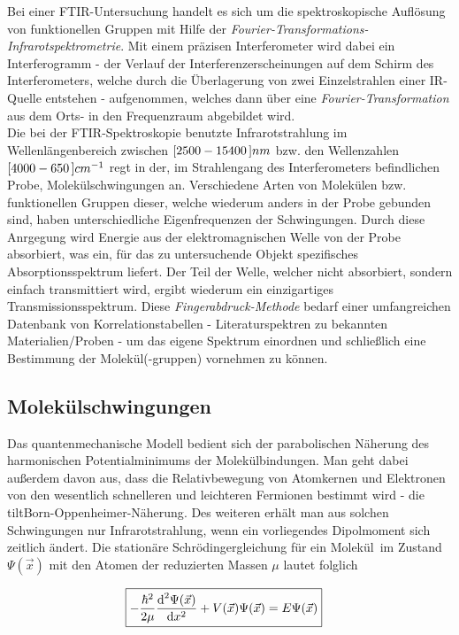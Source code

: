 \documentclass[a4paper,10pt,twocolumn]{article}
\newcommand{\diff}{\textnormal{d}}
\newcommand{\tilt}[1]{\textit{#1}}
\begin{document}
		Bei einer FTIR-Untersuchung handelt es sich um die spektroskopische Aufl\"osung von funktionellen Gruppen mit Hilfe der \tilt{Fourier-Transformations-Infrarotspektrometrie}. Mit einem pr\"azisen Interferometer wird dabei ein Interferogramm - der Verlauf der Interferenzerscheinungen auf dem Schirm des Interferometers, welche durch die \"Uberlagerung von zwei Einzelstrahlen einer IR-Quelle entstehen - aufgenommen, welches dann \"uber eine \tilt{Fourier-Transformation} aus dem Orts- in den Frequenzraum abgebildet wird.\\
		Die bei der FTIR-Spektroskopie benutzte Infrarotstrahlung im Wellenl\"angenbereich zwischen $\unit[[2500-15400]]{nm}$ bzw. den Wellenzahlen $\unit[[4000-650]]{cm^{-1}}$ regt in der, im Strahlengang des Interferometers befindlichen Probe, Molek\"ulschwingungen an. Verschiedene Arten von Molek\"ulen bzw. funktionellen Gruppen dieser, welche wiederum anders in der Probe gebunden sind, haben unterschiedliche Eigenfrequenzen der Schwingungen. Durch diese Anrgegung wird Energie aus der elektromagnischen Welle von der Probe absorbiert, was ein, f\"ur das zu untersuchende Objekt spezifisches Absorptionsspektrum liefert. Der Teil der Welle, welcher nicht absorbiert, sondern einfach transmittiert wird, ergibt wiederum ein einzigartiges Transmissionsspektrum. Diese \tilt{Fingerabdruck-Methode} bedarf einer umfangreichen Datenbank von Korrelationstabellen - Literaturspektren zu bekannten Materialien/Proben - um das eigene Spektrum einordnen und schlie{\ss}lich eine Bestimmung der Molek\"ul(-gruppen) vornehmen zu k\"onnen.
		
	\subsection{Molek\"ulschwingungen}
	
		Das quantenmechanische Modell bedient sich der parabolischen N\"aherung des harmonischen Potentialminimums der Molek\"ulbindungen. Man geht dabei au{\ss}erdem davon aus, dass die Relativbewegung von Atomkernen und Elektronen von den wesentlich schnelleren und leichteren Fermionen bestimmt wird - die tilt{Born-Oppenheimer-N\"aherung}. Des weiteren erh\"alt man aus solchen Schwingungen nur Infrarotstrahlung, wenn ein vorliegendes Dipolmoment sich zeitlich \"andert. Die station\"are Schr\"odingergleichung f\"ur ein Molek\"ul\ im Zustand $\Psi(\vec{x})$ mit den Atomen der reduzierten Massen $\mu$	lautet folglich \cite{FTIRInfra}
		
			\begin{align}
				\Aboxed{
				-\frac{\hbar^{2}}{2\mu}\frac{\diff^{2}\Psi(\vec{x})}{\diff x^{2}}+V(\vec{x})\Psi(\vec{x})=E\Psi(\vec{x})
				}
				\label{eq:schroed}
			\end{align}
	
\end{document}
